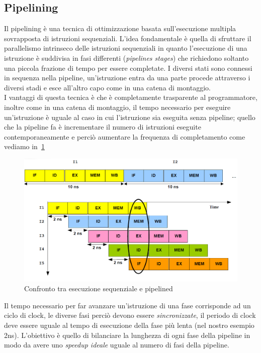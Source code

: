 \subsection{Pipelining}
Il pipelining è una tecnica di ottimizzazione basata sull'esecuzione multipla sovrapposta di istruzioni sequenziali. L'idea fondamentale è quella di sfruttare il parallelismo intrinseco delle istruzioni sequenziali in quanto l'esecuzione di una istruzione è suddivisa in fasi differenti (\emph{pipelines stages}) che richiedono soltanto una piccola frazione di tempo per essere completate. I diversi stati sono connessi in sequenza nella pipeline, un'istruzione entra da una parte procede attraverso i diversi stadi e esce all'altro capo come in una catena di montaggio.\\
I vantaggi di questa tecnica è che è completamente trasparente al programmatore, inoltre come in una catena di montaggio, il tempo necessario per eseguire un'istruzione è uguale al caso in cui l'istruzione sia eseguita senza pipeline; quello che la pipeline fa è incrementare il numero di istruzioni eseguite contemporaneamente e perciò aumentare la frequenza di completamento come vediamo in \figurename\,\ref{fig:seqvspipe}\\
\begin{figure}[tb]
\centering
\includegraphics[scale=0.4]{img/seqvspipe.png}
\caption{Confronto tra esecuzione sequenziale e pipelined}\label{fig:seqvspipe}
\end{figure}
Il tempo necessario per far avanzare un'istruzione di una fase corrisponde ad un ciclo di clock, le diverse fasi perciò devono essere \emph{sincronizzate}, il periodo di clock deve essere uguale al tempo di esecuzione della fase più lenta (nel nostro esempio 2ns). L'obiettivo è quello di bilanciare la lunghezza di ogni fase della pipeline in modo da avere uno \emph{speedup ideale} uguale al numero di fasi della pipeline.\\
